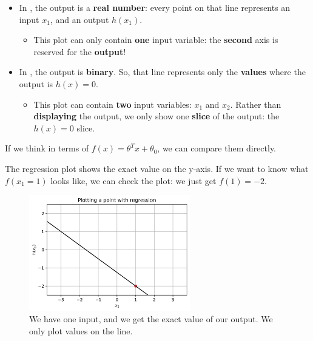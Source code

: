         \begin{itemize}
            \item In , the output is a \textbf{real number}: every point on that line represents an input $x_1$, and an output $h(x_1)$.
                
                \begin{itemize}
                    \item This plot can only contain \textbf{one} input variable: the \textbf{second} axis is reserved for the \textbf{output}!
                \end{itemize}
            
            \item In , the output is \textbf{binary}. So, that line represents only the \textbf{values} where the output is $h(x)=0$. 
                \begin{itemize}
                    \item This plot can contain \textbf{two} input variables: $x_1$ and $x_2$. Rather than \textbf{displaying} the output, we only show one \textbf{slice} of the output: the $h(x)=0$ slice.
                \end{itemize}
        \end{itemize}
        
        If we think in terms of $f(x) = \theta^Tx +\theta_0$, we can compare them directly.
        
        The regression plot shows the exact value on the y-axis. If we want to know what $f(x_1=1)$ looks like, we can check the plot: we just get $f(1)=-2$.
        
        \begin{figure}[H]
            \centering
            
            \includegraphics[width=70mm,scale=0.5]{images/classification_images/2d_regression_plot.png}
            \caption*{We have one input, and we get the exact value of our output. We only plot values on the line.}
        \end{figure}
        
